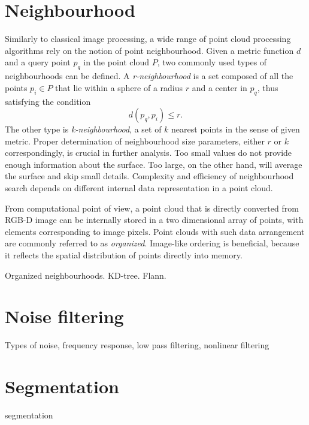 
\section{Neighbourhood}
\label{sec:neighbourhood}

Similarly to classical image processing, a wide range of point cloud processing algorithms rely on the notion of point neighbourhood. Given a metric function $d$ and a query point $p_q$ in the point cloud $P$, two commonly used types of neighbourhoods can be defined. A \textit{r-neighbourhood} is a set composed of all the points $p_i \in P$ that lie within a sphere of a radius $r$ and a center in $p_q$, thus satisfying the condition
\begin{equation}
d(p_	q, p_i) \leq r.
\end{equation}
The other type is \textit{k-neighbourhood}, a set of $k$ nearest points in the sense of given metric. Proper determination of neighbourhood size parameters, either $r$ or $k$ correspondingly, is crucial in further analysis. Too small values do not provide enough information about the surface. Too large, on the other hand, will average the surface and skip small details. Complexity and efficiency of neighbourhood search depends on different internal data representation in a point cloud.

From computational point of view, a point cloud that is directly converted from RGB-D image can be internally stored in a two dimensional array of points, with elements corresponding to image pixels. Point clouds with such data arrangement are commonly referred to as \textit{organized}. Image-like ordering is beneficial, because it reflects the spatial distribution of points directly into memory.



Organized neighbourhoods.
KD-tree.
Flann.



\section{Noise filtering}
\label{sec:noise}

Types of noise, frequency response, low pass filtering, nonlinear filtering


\section{Segmentation}
\label{sec:segmentation}

segmentation

